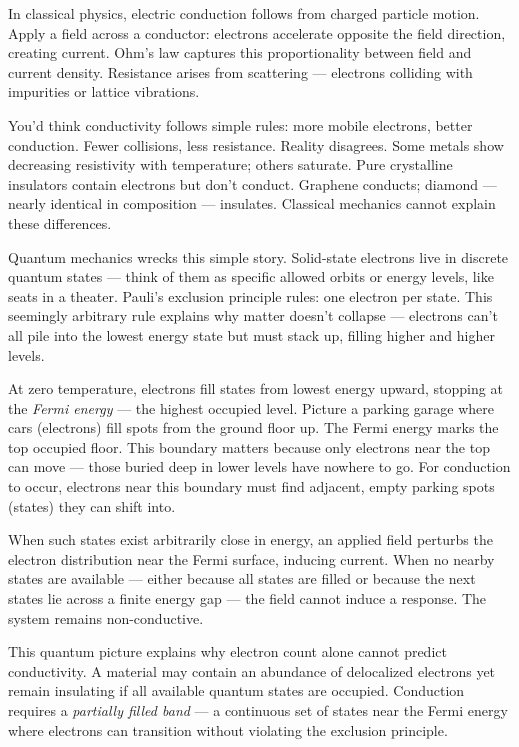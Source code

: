 In classical physics, electric conduction follows from charged particle motion. Apply a field across a conductor: electrons accelerate opposite the field direction, creating current. Ohm's law captures this proportionality between field and current density. Resistance arises from scattering — electrons colliding with impurities or lattice vibrations.

You'd think conductivity follows simple rules: more mobile electrons, better conduction. Fewer collisions, less resistance. Reality disagrees. Some metals show decreasing resistivity with temperature; others saturate. Pure crystalline insulators contain electrons but don't conduct. Graphene conducts; diamond — nearly identical in composition — insulates. Classical mechanics cannot explain these differences.

Quantum mechanics wrecks this simple story. Solid-state electrons live in discrete quantum states — think of them as specific allowed orbits or energy levels, like seats in a theater. Pauli's exclusion principle rules: one electron per state. This seemingly arbitrary rule explains why matter doesn't collapse — electrons can't all pile into the lowest energy state but must stack up, filling higher and higher levels.

At zero temperature, electrons fill states from lowest energy upward, stopping at the \emph{Fermi energy} — the highest occupied level. Picture a parking garage where cars (electrons) fill spots from the ground floor up. The Fermi energy marks the top occupied floor. This boundary matters because only electrons near the top can move — those buried deep in lower levels have nowhere to go. For conduction to occur, electrons near this boundary must find adjacent, empty parking spots (states) they can shift into.

When such states exist arbitrarily close in energy, an applied field perturbs the electron distribution near the Fermi surface, inducing current. When no nearby states are available — either because all states are filled or because the next states lie across a finite energy gap — the field cannot induce a response. The system remains non-conductive.

This quantum picture explains why electron count alone cannot predict conductivity. A material may contain an abundance of delocalized electrons yet remain insulating if all available quantum states are occupied. Conduction requires a \emph{partially filled band} — a continuous set of states near the Fermi energy where electrons can transition without violating the exclusion principle.

